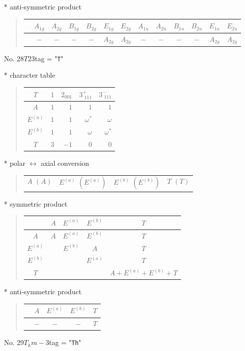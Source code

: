 \documentclass[fleqn,10pt,landscape]{jsarticle}
\begin{document}
* anti-symmetric product
\begin{quote}
\begin{tabular}{ccccccccccccc} \hline \hline
 & $ A_{1g} $ & $ A_{2g} $ & $ B_{1g} $ & $ B_{2g} $ & $ E_{1g} $ & $ E_{2g} $ & $ A_{1u} $ & $ A_{2u} $ & $ B_{1u} $ & $ B_{2u} $ & $ E_{1u} $ & $ E_{2u} $ \\ \hline
$  $ & $ - $ & $ - $ & $ - $ & $ - $ & $ A_{2g} $ & $ A_{2g} $ & $ - $ & $ - $ & $ - $ & $ - $ & $ A_{2g} $ & $ A_{2g} $ \\
 \hline \hline
\end{tabular}
\end{quote}
\newpage
No. 28\quad$T$\quad$23$\quad[ cubic ]
tag = "{\tt T}"

* character table
\begin{quote}
\begin{tabular}{crrrr} \hline \hline
$ T $ & $ 1 $ & $ 2{}_{001} $ & $ 3^{+}_{\,\,111} $ & $ 3^{-}_{\,\,111} $ \\ \hline
$ A $ & $ 1 $ & $ 1 $ & $ 1 $ & $ 1 $ \\
$ E^{(a)} $ & $ 1 $ & $ 1 $ & $ \omega^{*} $ & $ \omega $ \\
$ E^{(b)} $ & $ 1 $ & $ 1 $ & $ \omega $ & $ \omega^{*} $ \\
$ T $ & $ 3 $ & $ -1 $ & $ 0 $ & $ 0 $ \\
 \hline \hline
\end{tabular}
\end{quote}
* polar $\leftrightarrow$ axial conversion
\begin{quote}
\begin{tabular}{cccc}
$ A\,\,(A) $ & $ E^{(a)}\,\,(E^{(a)}) $ & $ E^{(b)}\,\,(E^{(b)}) $ & $ T\,\,(T) $
\end{tabular}
\end{quote}
* symmetric product
\begin{quote}
\begin{tabular}{c|cccc} \hline \hline
 & $ A $ & $ E^{(a)} $ & $ E^{(b)} $ & $ T $ \\ \hline
$ A $ & $ A $ & $ E^{(a)} $ & $ E^{(b)} $ & $ T $ \\
$ E^{(a)} $ & $  $ & $ E^{(b)} $ & $ A $ & $ T $ \\
$ E^{(b)} $ & $  $ & $  $ & $ E^{(a)} $ & $ T $ \\
$ T $ & $  $ & $  $ & $  $ & $ A + E^{(a)} + E^{(b)} + T $ \\
 \hline \hline
\end{tabular}
\end{quote}
* anti-symmetric product
\begin{quote}
\begin{tabular}{ccccc} \hline \hline
 & $ A $ & $ E^{(a)} $ & $ E^{(b)} $ & $ T $ \\ \hline
$  $ & $ - $ & $ - $ & $ - $ & $ T $ \\
 \hline \hline
\end{tabular}
\end{quote}
\newpage
No. 29\quad$T_{h}$\quad$m-3$\quad[ cubic ]
tag = "{\tt Th}"
\end{document}
